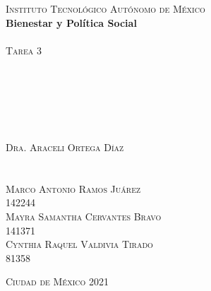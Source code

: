 \documentclass[
  11pt,
]{article}
\author{}
\date{\vspace{-2.5em}}
\begin{document}
\begin{titlepage}
\begin{center}

\textsc{\Large Instituto Tecnológico Autónomo de México}\\[2em]

\textbf{\LARGE Bienestar y Política Social}\\[2em]


\textsc{\LARGE }\\[1em]


\textsc{\large Tarea 3 }\\[1em]

\textsc{\LARGE }\\[1em]

\textsc{\large }\\[1em]
\textsc{\LARGE }\\[1em]
\textsc{\LARGE }\\[1em]

\textsc{\large }\\[1em]
\textsc{\LARGE }\\[1em]

\textsc{\LARGE Dra. Araceli Ortega Díaz}\\[1em]

\textsc{\LARGE }\\[1em]
\textsc{\LARGE }\\[1em]

\textsc{\LARGE Marco Antonio Ramos Juárez}\\[1em]

\textsc{\large 142244}\\[1em]

\textsc{\LARGE Mayra Samantha Cervantes Bravo}\\[1em]

\textsc{\large 141371}\\[1em]

\textsc{\LARGE Cynthia Raquel Valdivia Tirado }\\[1em]

\textsc{\large 81358}\\[1em]

\end{center}

\vspace*{\fill}
\textsc{Ciudad de México \hspace*{\fill} 2021}

\end{titlepage}

\newpage
\end{document}
